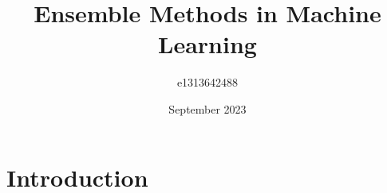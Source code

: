 \documentclass{article}
\title{Ensemble Methods in Machine Learning}
\author{e1313642488 }
\date{September 2023}
\begin{document}
\maketitle

\section{Introduction}
\end{document}
